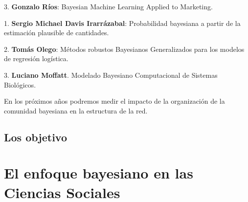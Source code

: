 \documentclass[a4paper,11pt]{book}
\theoremstyle{definition}
\begin{document}
\hspace{0.6cm} 3. \textbf{Gonzalo Ríos}: Bayesian Machine Learning Applied to Marketing.


\justify \vspace{0.6cm}


\vspace{0.2cm}

\hspace{0.6cm} 1. \textbf{Sergio Michael Davis Irarrázabal}: Probabilidad bayesiana a partir de la estimación plausible de cantidades.

\hspace{0.6cm} 2. \textbf{Tomás Olego}: Métodos robustos Bayesianos Generalizados para los modelos de regresión logística.

\hspace{0.6cm} 3. \textbf{Luciano Moffatt}. Modelado Bayesiano  Computacional de Sistemas Biológicos.



En los próximos años podremos medir el impacto de la organización de la comunidad bayesiana en la estructura de la red.

\subsection{Los objetivo}

\section{El enfoque bayesiano en las Ciencias Sociales} \label{sec:volverAlFuturo}
\end{document}

